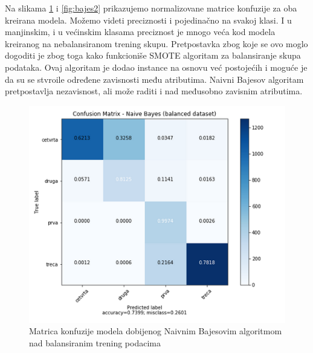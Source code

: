 \documentclass[a4paper]{article}
\begin{document}
Na slikama \ref{fig:bajes1} i \ref{fig:bajes2} prikazujemo normalizovane matrice konfuzije za oba kreirana modela. Možemo videti preciznosti i pojedinačno na svakoj klasi. I u manjinskim, i u većinskim klasama preciznost je mnogo veća kod modela kreiranog na nebalansiranom trening skupu. Pretpostavka zbog koje se ovo moglo dogoditi je zbog toga kako funkcioniše SMOTE algoritam za balansiranje skupa podataka. Ovaj algoritam je dodao instance na osnovu već postojećih i moguće je da su se stvroile određene zavisnosti među atributima. Naivni Bajesov algoritam pretpostavlja nezavisnost, ali može raditi i nad međusobno zavisnim atributima. 

\begin{figure}[h!]
\begin{center}
\includegraphics[scale=0.5]{bajes_balansirani_skup.png}
\end{center}
\caption{Matrica konfuzije modela dobijenog Naivnim Bajesovim algoritmom nad balansiranim trening podacima}
\label{fig:bajes1}
\end{figure}

\newpage
\end{document}
